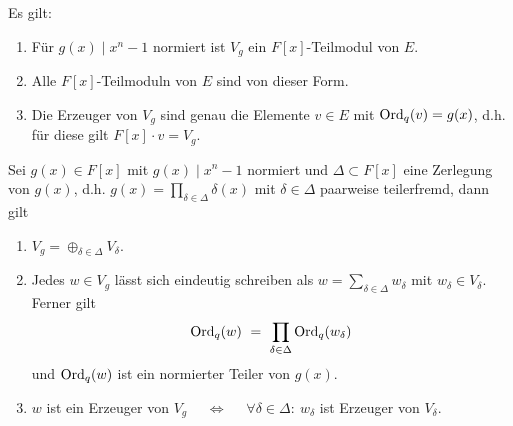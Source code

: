 \documentclass{vorlage}
\begin{document}
\begin{frame}[<+->]
  \begin{satz}
    Es gilt:
    \begin{enumerate}[<+->]
      \item Für $g(x)\mid x^n-1$ normiert ist $V_g$ ein $F[x]$-Teilmodul von
        $E$.
      \item Alle $F[x]$-Teilmoduln von $E$ sind von dieser Form.
      \item Die Erzeuger von $V_g$ sind genau die Elemente 
        $v\in E$ mit $\operatorname{Ord}_q(v) = g(x)$, d.h. für diese gilt
        $F[x]\cdot v = V_g$. 
    \end{enumerate}
  \end{satz}
  \begin{satz}
    Sei $g(x) \in F[x]$ mit $g(x)\mid x^n-1$ normiert 
    und $\Delta\subset F[x]$ eine Zerlegung von $g(x)$, d.h.
    $g(x) = \prod_{\delta\in\Delta} \delta(x)$ mit
    $\delta\in\Delta$ paarweise teilerfremd, dann gilt
    \begin{enumerate}[<+->]
      \item $V_g = \oplus_{\delta\in\Delta} V_\delta$.
      \item Jedes $w\in V_g$ lässt sich eindeutig schreiben als 
        $w = \sum_{\delta\in\Delta} w_\delta$ mit $w_\delta \in V_\delta$.
        Ferner gilt
        \[ \operatorname{Ord}_q(w) \ =\  \prod_{\delta\in\Delta} \operatorname{Ord}_q(w_\delta)\]
        und $\operatorname{Ord}_q(w)$ ist ein normierter Teiler von $g(x)$.
      \item $w$ ist ein Erzeuger von $V_g$ $\quad\Leftrightarrow\quad$
        $\forall\delta\in \Delta:\ w_\delta$ ist Erzeuger von 
        $V_\delta$.
    \end{enumerate}
  \end{satz}
\end{frame}

\end{document}
